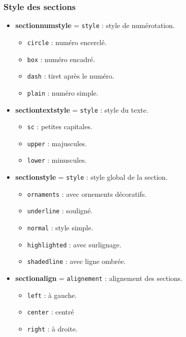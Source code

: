 \documentclass[
    french,
    margin=2cm
]{neoschool}
\begin{document}
\subsubsection{Style des sections}

\begin{itemize}
\item \textbf{sectionnumstyle} = \texttt{style} : style de
  numérotation.
  \begin{itemize}
  \item \texttt{circle} : numéro encerclé.
  \item \texttt{box} : numéro encadré.
  \item \texttt{dash} : tiret après le numéro.
  \item \texttt{plain} : numéro simple.
  \end{itemize}
\item \textbf{sectiontextstyle} = \texttt{style} : style du
  texte.
  \begin{itemize}
  \item \texttt{sc} : petites capitales.
  \item \texttt{upper} : majuscules.
  \item \texttt{lower} : minuscules.
  \end{itemize}
\item \textbf{sectionstyle} = \texttt{style} : style global
  de la section.
  \begin{itemize}
  \item \texttt{ornaments} : avec ornements décoratifs.
  \item \texttt{underline} : souligné.
  \item \texttt{normal} : style simple.
  \item \texttt{highlighted} : avec surlignage.
  \item \texttt{shadedline} : avec ligne ombrée.
  \end{itemize}
\item \textbf{sectionalign} = \texttt{alignement} :
  alignement des sections.
  \begin{itemize}
  \item \texttt{left} : à gauche.
  \item \texttt{center} : centré
  \item \texttt{right} : à droite.
  \end{itemize}
\end{itemize}

\end{document}

